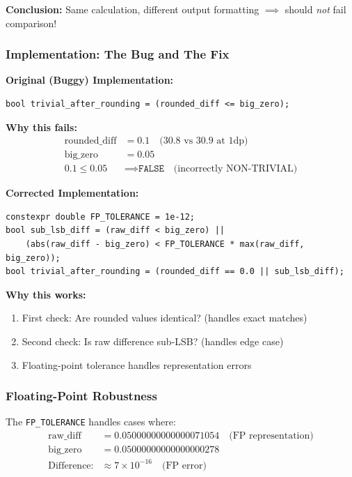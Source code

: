 \documentclass[11pt,letterpaper]{article}
\begin{document}
\textbf{Conclusion:} Same calculation, different output formatting $\implies$ should \emph{not} fail comparison!

\subsubsection{Implementation: The Bug and The Fix}

\textbf{Original (Buggy) Implementation:}
\begin{verbatim}
bool trivial_after_rounding = (rounded_diff <= big_zero);
\end{verbatim}

\textbf{Why this fails:}
\begin{align*}
    \text{rounded\_diff} &= 0.1 \quad \text{(30.8 vs 30.9 at 1dp)} \\
    \text{big\_zero} &= 0.05 \\
    0.1 \leq 0.05 &\implies \texttt{FALSE} \quad \text{(incorrectly NON-TRIVIAL)}
\end{align*}

\textbf{Corrected Implementation:}
\begin{verbatim}
constexpr double FP_TOLERANCE = 1e-12;
bool sub_lsb_diff = (raw_diff < big_zero) ||
    (abs(raw_diff - big_zero) < FP_TOLERANCE * max(raw_diff, big_zero));
bool trivial_after_rounding = (rounded_diff == 0.0 || sub_lsb_diff);
\end{verbatim}

\textbf{Why this works:}
\begin{enumerate}
    \item First check: Are rounded values identical? (handles exact matches)
    \item Second check: Is raw difference sub-LSB? (handles edge case)
    \item Floating-point tolerance handles representation errors
\end{enumerate}

\subsubsection{Floating-Point Robustness}

The \texttt{FP\_TOLERANCE} handles cases where:
\begin{align*}
    \text{raw\_diff} &= 0.05000000000000071054 \quad \text{(FP representation)} \\
    \text{big\_zero} &= 0.05000000000000000278 \\
    \text{Difference:} &\approx 7 \times 10^{-16} \quad \text{(FP error)}
\end{align*}
\end{document}
